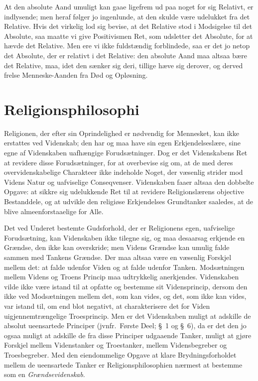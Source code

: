 \documentclass[12pt]{book}
\newcommand{\apage}[1]{\marginnote{\footnotesize\textit{[#1]}}}
\begin{document}
At den absolute Aand umuligt kan gaae ligefrem ud paa noget for sig Relativt,
er indlysende; men heraf følger jo ingenlunde, at den skulde være udelukket fra
det Relative. Hvis det virkelig lod sig bevise, at det Relative stod i
Modsigelse til det Absolute, saa maatte vi give Positivismen Ret, som udsletter
det Absolute, for at hævde det Relative. Men ere vi ikke fuldstændig
forblindede, saa er det jo netop det Absolute, der er relativt i det Relative:
den absolute Aand maa altsaa bære det Relative, maa, idet den sænker sig deri,
tillige hæve sig derover, og derved frelse Menneske-Aanden fra Død og
Opløsning.

\section{Religionsphilosophi}
\label{sec:26}

\noindent Religionen, der efter sin Oprindelighed er nødvendig for Mennesket,
kan ikke erstattes ved Videnskab; den har og maa have sin egen
Erkjendelseslære, sine egne af Videnskaben uafhængige Forudsætninger. Dog \apage{278} er
det Videnskabens Ret at revidere disse Forudsætninger, for at overbevise sig
om, at de med deres overvidenskabelige Charakteer ikke indeholde Noget, der
væsenlig strider mod Videns Natur og uafviselige Conseqvenser. Videnskaben
faaer altsaa den dobbelte Opgave: at sikkre sig udelukkende Ret til at revidere
Religionslærens objective Bestanddele, og at udvikle den religiøse Erkjendelses
Grundtanker saaledes, at de blive almeenforstaaelige for Alle.

Det ved Underet bestemte Gudsforhold, der er Religionens egen, uafviselige
Forudsætning, kan Videnskaben ikke tilegne sig, og maa desaarsag erkjende en
Grændse, den ikke kan overskride; men Videns Grændse kan umulig falde sammen
med Tankens Grændse. Der maa altsaa være en væsenlig Forskjel mellem det: at
falde udenfor Viden og at falde udenfor Tanken. Modsætningen mellem Videns og
Troens Princip maa udtrykkelig anerkjendes. Videnskaben vilde ikke være istand
til at opfatte og bestemme sit Vidensprincip, dersom den ikke ved Modsætningen
mellem det, som kan vides, og det, som ikke kan vides, var istand til, om end
blot negativt, at charakterisere det for Viden uigjennemtrængelige
Troesprincip. Men er det Videnskaben muligt at adskille de absolut ueensartede
Principer (jvnfr.\ Første Deel; §\ 1 og §\ 6), da er det den jo ogsaa muligt at
adskille de fra disse Principer udgaaende Tanker, muligt at gjøre Forskjel
mellem Videnstanker og Troestanker, mellem Vidensbegreber og Troesbegreber. Med
den eiendommelige Opgave at klare Brydningsforholdet mellem de  \apage{279} ueensartede
Tanker er Religionsphilosophien nærmest at bestemme som en \emph{Grændsevidenskab}.
\end{document}
